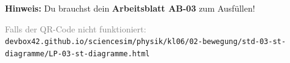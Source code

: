 \documentclass[11pt, a4paper]{article}
\begin{document}
\vspace{1.5em}


\begin{tcolorbox}[
    colback=white,
    colframe=physik,
    boxrule=1pt,
    arc=0pt
]
\textbf{Hinweis:} Du brauchst dein \textbf{Arbeitsblatt AB-03} zum Ausfüllen!
\end{tcolorbox}

\vfill


\begin{center}
\textcolor{gray}{\small Falls der QR-Code nicht funktioniert:}\\[0.3em]
\texttt{\small devbox42.github.io/sciencesim/physik/kl06/02-bewegung/std-03-st-diagramme/LP-03-st-diagramme.html}
\end{center}
\end{document}
